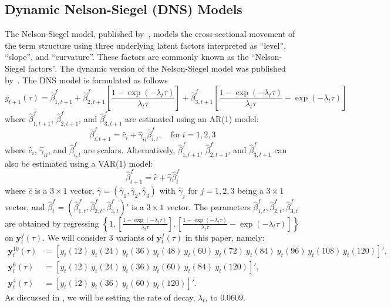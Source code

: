 \subsection{Dynamic Nelson-Siegel (DNS) Models}
\label{sec:dns}
The Nelson-Siegel model, published by~\textcite{Nelson1987}, models the cross-sectional movement of the term structure using three underlying latent factors interpreted as \enquote{level}, \enquote{slope}, and \enquote{curvature}. These factors are commonly known as the \enquote{Nelson-Siegel factors}. The dynamic version of the Nelson-Siegel model was published by~\textcite[hereafter DNS]{Diebold2006}. The DNS model is formulated as follows
\begin{equation}
	y_{t+1}(\tau) = \hat{\beta}_{1,t+1}^{f} + \hat{\beta}_{2,t+1}^{f} \left[\frac{1-\exp(-\lambda_t \tau)}{\lambda_t \tau}\right] + \hat{\beta}_{3,t+1}^{f} \left[\frac{1-\exp(-\lambda_t \tau)}{\lambda_t \tau} - \exp(-\lambda_t \tau)\right]
\end{equation}
where $\hat{\beta}_{1,t+1}^{f}$, $\hat{\beta}_{2,t+1}^{f}$, and $\hat{\beta}_{3,t+1}^{f}$ are estimated using an AR(1) model:
\begin{equation}
	\hat{\beta}_{i,t+1}^{f} = \hat{c}_i + \hat{\gamma}_{ii} \hat{\beta}_{i,t}^f, \quad \text{for}~i = 1,2,3
\end{equation}
where $\hat{c}_i$, $\hat{\gamma}_{ii}$, and $\hat{\beta}_{i,t}^f$ are scalars. Alternatively, $\hat{\beta}_{1,t+1}^{f}$, $\hat{\beta}_{2,t+1}^{f}$, and $\hat{\beta}_{3,t+1}^{f}$ can also be estimated using a VAR(1) model:
\begin{equation}
	\hat{\beta}_{t+1}^{f} = \hat{c} + \hat{\gamma} \hat{\beta}_t^f
\end{equation}
where $\hat{c}$ is a $3 \times 1$ vector, $\hat{\gamma} = \left(\hat{\gamma}_1, \hat{\gamma}_2, \hat{\gamma}_3 \right)$ with $\hat{\gamma}_j$ for $j = 1,2,3$ being a $3 \times 1$ vector, and $\hat{\beta}_t^f = \left(\hat{\beta}_{1,t}^f, \hat{\beta}_{2,t}^f, \hat{\beta}_{3,t}^f\right)'$ is a $3 \times 1$ vector. The parameters $\hat{\beta}_{1,t}^f, \hat{\beta}_{2,t}^f, \hat{\beta}_{3,t}^f$ are obtained by regressing $\left\{1, \left[\frac{1-\exp(-\lambda_t \tau)}{\lambda_t \tau}\right], \left[\frac{1-\exp(-\lambda_t \tau)}{\lambda_t \tau} - \exp(-\lambda_t \tau)\right] \right\}$ on $\mathbf{y}_t^f(\tau)$. We will consider 3 variants of $\mathbf{y}_t^f(\tau)$ in this paper, namely:
\begin{align*}
	\mathbf{y}_t^{10}(\tau) &= \left[y_t(12)~y_t(24)~y_t(36)~y_t(48)~y_t(60)~y_t(72)~y_t(84)~y_t(96)~y_t(108)~y_t(120) \right]', \\
	\mathbf{y}_t^6(\tau) &= \left[y_t(12)~y_t(24)~y_t(36)~y_t(60)~y_t(84)~y_t(120) \right]', \\
	\mathbf{y}_t^4(\tau) &= \left[y_t(12)~y_t(36)~y_t(60)~y_t(120) \right]'.
\end{align*}
As discussed in \textcite{Diebold2006}, we will be setting the rate of decay, $\lambda_t$, to $0.0609$.

